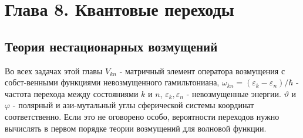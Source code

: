 \documentclass[11pt,a4paper]{exam}
\begin{document}
\section{ Глава 8. Квантовые переходы }


\subsection{ Теория  нестационарных возмущений }

Во всех задачах этой главы ${V_{kn}}$ - матричный элемент оператора возмущения с собст-венными функциями невозмущенного гамильтониана, ${\omega _{kn}} = ({\varepsilon _k} - {\varepsilon _n})/\hbar $ - частота перехода между состояниями $k$ и $n$, ${\varepsilon _k},{\varepsilon _n}$ - невозмущенные энергии. $\vartheta $ и $\varphi $ - полярный и ази-мутальный углы сферической системы координат соответственно. Если это не оговорено особо, вероятности переходов нужно вычислять в первом порядке теории возмущений для волновой функции.
\end{document}
